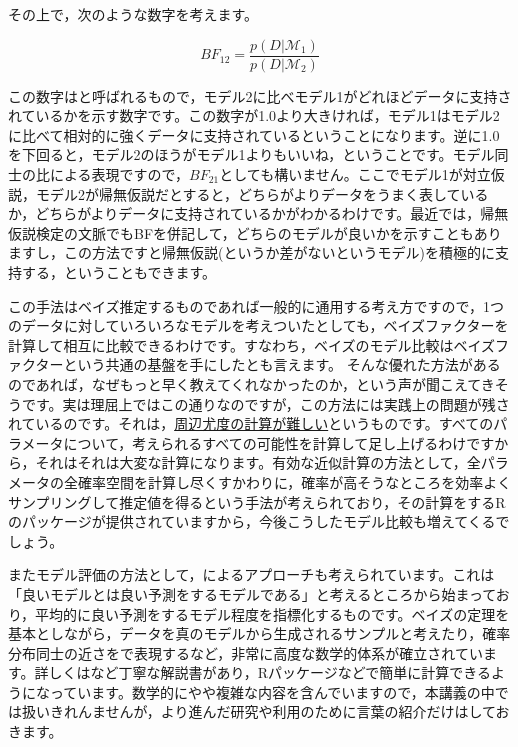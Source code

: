 \documentclass{ltjsbook}
\begin{document}
その上で，次のような数字を考えます。

\[ BF_{12} = \frac{p(D| \mathcal{M}_1)}{p(D| \mathcal{M}_2)} \]

この数字はと呼ばれるもので，モデル2に比べモデル1がどれほどデータに支持されているかを示す数字です。この数字が1.0より大きければ，モデル1はモデル2に比べて相対的に強くデータに支持されているということになります。逆に1.0を下回ると，モデル2のほうがモデル1よりもいいね，ということです。モデル同士の比による表現ですので，$BF_{21}$としても構いません。ここでモデル1が対立仮説，モデル2が帰無仮説だとすると，どちらがよりデータをうまく表しているか，どちらがよりデータに支持されているかがわかるわけです。最近では，帰無仮説検定の文脈でもBFを併記して，どちらのモデルが良いかを示すこともありますし，この方法ですと帰無仮説(というか差がないというモデル)を積極的に支持する，ということもできます。

この手法はベイズ推定するものであれば一般的に通用する考え方ですので，1つのデータに対していろいろなモデルを考えついたとしても，ベイズファクターを計算して相互に比較できるわけです。すなわち，ベイズのモデル比較はベイズファクターという共通の基盤を手にしたとも言えます。
そんな優れた方法があるのであれば，なぜもっと早く教えてくれなかったのか，という声が聞こえてきそうです。実は理屈上ではこの通りなのですが，この方法には実践上の問題が残されているのです。それは，\underline{周辺尤度の計算が難しい}というものです。すべてのパラメータについて，考えられるすべての可能性を計算して足し上げるわけですから，それはそれは大変な計算になります。有効な近似計算の方法として，全パラメータの全確率空間を計算し尽くすかわりに，確率が高そうなところを効率よくサンプリングして推定値を得るという手法が考えられており，その計算をするRのパッケージ\citep{bridgesampling}が提供されていますから，今後こうしたモデル比較も増えてくるでしょう。

またモデル評価の方法として，によるアプローチも考えられています。これは「良いモデルとは良い予測をするモデルである」と考えるところから始まっており，平均的に良い予測をするモデル程度を指標化するものです。ベイズの定理を基本としながら，データを真のモデルから生成されるサンプルと考えたり，確率分布同士の近さをで表現するなど，非常に高度な数学的体系が確立されています。詳しくは\citet{浜田201912}など丁寧な解説書があり，Rパッケージなどで簡単に計算できるようになっています\citep{loo}。数学的にやや複雑な内容を含んでいますので，本講義の中では扱いきれんませんが，より進んだ研究や利用のために言葉の紹介だけはしておきます。
\end{document}

